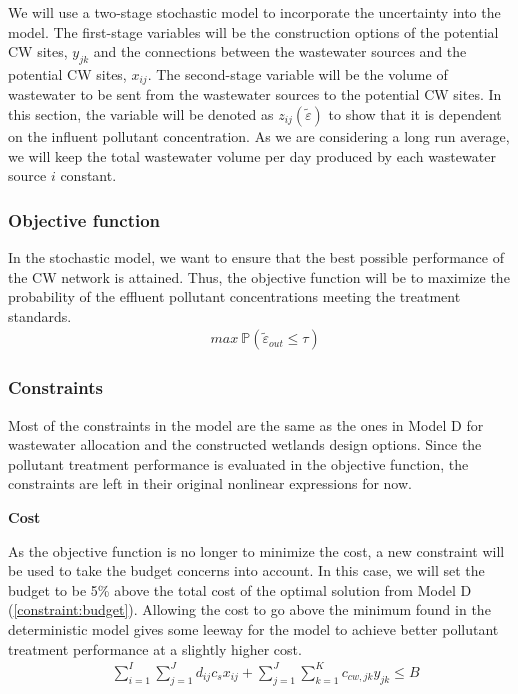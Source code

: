 \documentclass[preprint,12pt,authoryear]{elsarticle}
\newcommand{\bP}{\mathbb P}
\begin{document}
We will use a two-stage stochastic model to incorporate the uncertainty into the model. The first-stage variables will be the construction options of the potential CW sites, $y_{jk}$ and the connections between the wastewater sources and the potential CW sites, $x_{ij}$. The second-stage variable will be the volume of wastewater to be sent from the wastewater sources to the potential CW sites. In this section, the variable will be denoted as $z_{ij} (\tilde{\varepsilon})$ to show that it is dependent on the influent pollutant concentration. As we are considering a long run average, we will keep the total wastewater volume per day produced by each wastewater source $i$ constant. 

\subsubsection{Objective function}
In the stochastic model, we want to ensure that the best possible performance of the CW network is attained. Thus, the objective function will be to maximize the probability of the effluent pollutant concentrations meeting the treatment standards. 
\begin{align}
	&max~\bP(\tilde{\varepsilon}_{out} \leq \tau)
\end{align}

\subsubsection{Constraints}
Most of the constraints in the model are the same as the ones in Model D for wastewater allocation and the constructed wetlands design options. Since the pollutant treatment performance is evaluated in the objective function, the constraints are left in their original nonlinear expressions for now. 

\noindent\textbf{Cost}

As the objective function is no longer to minimize the cost, a new constraint will be used to take the budget concerns into account. In this case, we will set the budget to be 5\% above the total cost of the optimal solution from Model D (\autoref{constraint:budget}). Allowing the cost to go above the minimum found in the deterministic model gives some leeway for the model to achieve better pollutant treatment performance at a slightly higher cost.
\begin{align}\label{constraint:budget}
	&\sum_{i=1}^I \sum_{j=1}^J d_{ij} c_s x_{ij} + \sum_{j=1}^J \sum_{k=1}^K c_{cw,jk} y_{jk} \leq B 
\end{align}
\end{document}

